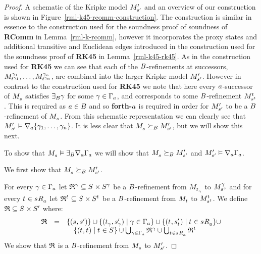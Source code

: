 \begin{proof}
A schematic of the Kripke model $\kPModelP{\kStateSP}$ and an overview of our construction is shown in Figure~\ref{rml-k45-rcomm-construction}.
The construction is similar in essence to the construction used for the soundness proof of soundness of {\bf RComm} in Lemma~\ref{rml-k-rcomm}, however it incorporates the proxy states and additional transitive and Euclidean edges introduced in the construction used for the soundness proof of {\bf RK45} in Lemma~\ref{rml-k45-rk45}.
As in the construction used for {\bf RK45} we can see that each of the $\agentsB$-refinements at successors, $\kPModel[\gamma_1]{\kStateT[\gamma_1]}, \dots, \kPModel[\gamma_n]{\kStateT[\gamma_n]}$, are combined into the larger Kripke model $\kPModelP{\kStateSP}$.
However in contrast to the construction used for {\bf RK45} we note that here every $\agentA$-successor of $\kPModel{\kStateS}$ satisfies $\somerefsBs \gamma$ for some $\gamma \in \Gamma_\agentA$, and corresponds to some $\agentsB$-refinement $\kPModel[\kStateT]{\kStateS[\kStateT]}$.
This is required as $\agentA \in \agentsB$ and so {\bf forth-$\agentA$} is required in order for $\kPModelP{\kStateSP}$ to be a $\agentsB$-refinement of $\kPModel{\kStateS}$.
From this schematic representation we can clearly see that $\kPModelP{\kStateSP} \entails \coversA \{\gamma_1, \dots, \gamma_n\}$.
It is less clear that $\kPModel{\kStateS} \simulatesBs \kPModelP{\kStateSP}$, but we will show this next.

\pagebreak

To show that $\kPModel{\kStateS} \entails \somerefsBs \coversA \Gamma_\agentA$ we will show that $\kPModel{\kStateS} \simulatesBs \kPModelP{\kStateSP}$ and $\kPModelP{\kStateSP} \entails \coversA \Gamma_\agentA$.

We first show that $\kPModel{\kStateS} \simulatesBs \kPModelP{\kStateSP}$.

For every $\gamma \in \Gamma_\agentA$ let $\refinement^\gamma \subseteq \kStates \times \kStates[\gamma]$ be a $\agentsB$-refinement from $\kPModel{\kStateT_\gamma}$ to $\kPModel[\gamma]{\kStateS[\gamma]}$ and
for every $\kStateT \in \kSuccessorsA{\kStateS}$ let $\refinement^{\kStateT} \subseteq \kStates \times \kStates[\kStateT]$ be a $\agentsB$-refinement from $\kPModel{\kStateT}$ to $\kPModel[\kStateT]{\kStateS[\kStateT]}$.
We define $\refinement \subseteq \kStates \times \kStatesP$ where:
$$
\begin{array}{rcl}
    \refinement &=& \{(\kStateS, \kStateSP)\} \cup \{(\kStateT_\gamma, \kStateSP_\gamma) \mid \gamma \in \Gamma_\agentA\} \cup \{(\kStateT, \kStateSP_{\kStateT}) \mid \kStateT \in \kSuccessorsA{\kStateS}\} \cup \\&&\quad \{(\kStateT, \kStateT) \mid \kStateT \in \kStates\} \cup \bigcup_{\gamma \in \Gamma_\agentA} \refinement^\gamma \cup \bigcup_{\kStateT \in \kSuccessorsA{\kStateS}} \refinement^{\kStateT}
\end{array}
$$
We show that $\refinement$ is a $\agentsB$-refinement from $\kPModel{\kStateS}$ to $\kPModelP{\kStateSP}$.


\end{proof}
